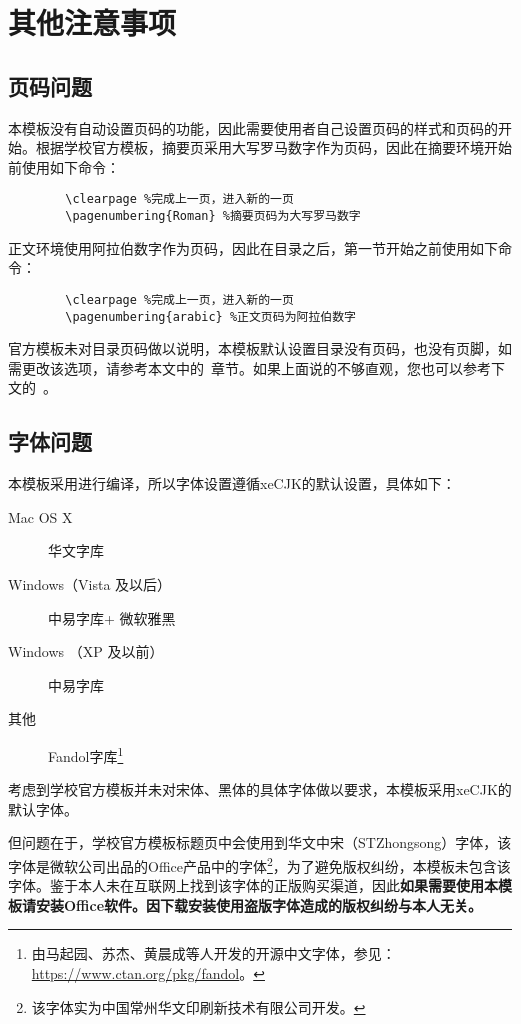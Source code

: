 \documentclass[UTF8,sub3section]{ctexart}
\begin{document}
	\section{其他注意事项}
	\subsection{页码问题}\label{subsec:pagenum}
	本模板没有自动设置页码的功能，因此需要使用者自己设置页码的样式和页码的开始。根据学校官方模板，摘要页采用大写罗马数字作为页码，因此在摘要环境开始前使用如下命令：
	\begin{verbatim}
		\clearpage %完成上一页，进入新的一页
		\pagenumbering{Roman} %摘要页码为大写罗马数字
	\end{verbatim}
	正文环境使用阿拉伯数字作为页码，因此在目录之后，第一节开始之前使用如下命令：
	\begin{verbatim}
		\clearpage %完成上一页，进入新的一页
		\pagenumbering{arabic} %正文页码为阿拉伯数字
	\end{verbatim}
	官方模板未对目录页码做以说明，本模板默认设置目录没有页码，也没有页脚，如需更改该选项，请参考本文中的~章节。如果上面说的不够直观，您也可以参考下文的~。
	
	\subsection{字体问题}
	本模板采用\XeLaTeX 进行编译，所以字体设置遵循xeCJK的默认设置，具体如下：
	\begin{description}
		\item[Mac OS X] 华文字库
		\item[Windows（Vista 及以后）]中易字库+ 微软雅黑
		\item[Windows （XP 及以前）] 中易字库
		\item[其他] Fandol字库\footnote{由马起园、苏杰、黄晨成等人开发的开源中文字体，参见：\url{https://www.ctan.org/pkg/fandol}。}
	\end{description}\cite[\S 4.3]{ctexdoc}
	考虑到学校官方模板并未对宋体、黑体的具体字体做以要求，本模板采用xeCJK的默认字体。
	
	但问题在于，学校官方模板标题页中会使用到华文中宋（STZhongsong）字体，该字体是微软\textsuperscript{\textregistered}公司出品的Office产品中的字体\footnote{该字体实为中国常州华文印刷新技术有限公司\textsuperscript{\texttrademark}开发。}，为了避免版权纠纷，本模板未包含该字体。鉴于本人未在互联网上找到该字体的正版购买渠道，因此{\bfseries 如果需要使用本模板请安装Office软件。因下载安装使用盗版字体造成的版权纠纷与本人无关。}
	
\end{document}
